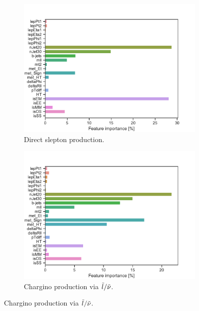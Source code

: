 \begin{figure}[H]
    \centering
    \begin{subfigure}[t!]{0.49\textwidth}
        \includegraphics[width = \textwidth]{Figures/SlepSlep/ML/BDT/All_level/Low/featureImportance.pdf}
        \caption{Direct slepton production.}
        \label{fig:featSlepslepLow}
    \end{subfigure}
    \begin{subfigure}[t!]{0.49\textwidth}
        \includegraphics[width = \textwidth]{Figures/SlepSnu/BDT/All_level/Low/featureImportance.pdf}
        \caption{Chargino production via $\Tilde{l}/\Tilde{\nu}$.}
        \label{fig:featSlepsnuLow}
    \end{subfigure}

\end{figure}
